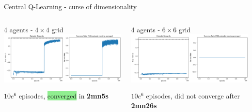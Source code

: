 \documentclass[aspectratio=169,xcolor=dvipsnames]{beamer}
\begin{document}
\begin{frame}{Central Q-Learning - curse of dimensionality}
\begin{columns}
    \begin{column}{0.5\textwidth}
    \scriptsize
        \begin{block}{4 agents - $4 \times 4$ grid}
            \centering
            \includegraphics[scale=0.18]{images/4-agents-4x4-10e6.png}
            
            $10e^6$ episodes, \colorbox{lightgreen}{converged} in \textbf{2mn5s}
        \end{block}
    \end{column}
    \begin{column}{0.5\textwidth}
    \scriptsize
        \begin{block}{4 agents - $6 \times 6$ grid}
            \centering
            \includegraphics[scale=0.18]{images/4-agents-6x6-10e6.png}
            
            $10e^6$ episodes, \colorbox{lightred}{did not converge} after \textbf{2mn26s}
        \end{block}
    \end{column}
\end{columns}


\end{frame}

\end{document}
